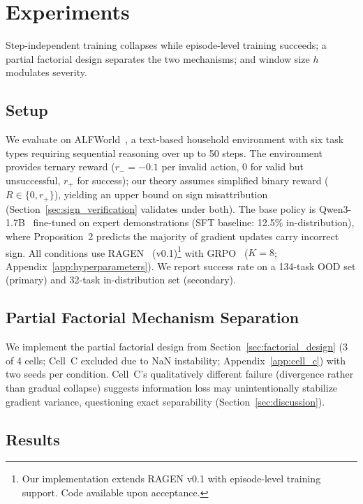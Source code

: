 \section{Experiments}
\label{sec:experiments}

Step-independent training collapses while episode-level training succeeds; a partial factorial design separates the two mechanisms; and window size $h$ modulates severity.

\subsection{Setup}
\label{sec:setup}

We evaluate on ALFWorld~\citep{shridhar2021alfworld}, a text-based household environment with six task types requiring sequential reasoning over up to 50 steps. The environment provides ternary reward ($r_- {=} {-}0.1$ per invalid action, $0$ for valid but unsuccessful, $r_+$ for success); our theory assumes simplified binary reward ($R \in \{0, r_+\}$), yielding an upper bound on sign misattribution (Section~\ref{sec:sign_verification} validates under both). The base policy is Qwen3-1.7B~\citep{qwen3_2025} fine-tuned on expert demonstrations (SFT baseline: 12.5\% in-distribution), where Proposition~2 predicts the majority of gradient updates carry incorrect sign. All conditions use RAGEN~\citep{ragen2025} (v0.1)\footnote{Our implementation extends RAGEN v0.1 with episode-level training support. Code available upon acceptance.} with GRPO~\citep{shao2024deepseekmath} ($K{=}8$; Appendix~\ref{app:hyperparameters}). We report success rate on a 134-task OOD set (primary) and 32-task in-distribution set (secondary).

\subsection{Partial Factorial Mechanism Separation}
\label{sec:factorial_experiments}

We implement the partial factorial design from Section~\ref{sec:factorial_design} (3 of 4 cells; Cell~C excluded due to NaN instability; Appendix~\ref{app:cell_c}) with two seeds per condition. Cell~C's qualitatively different failure (divergence rather than gradual collapse) suggests information loss may unintentionally stabilize gradient variance, questioning exact separability (Section~\ref{sec:discussion}).

\subsection{Results}
\label{sec:results}

